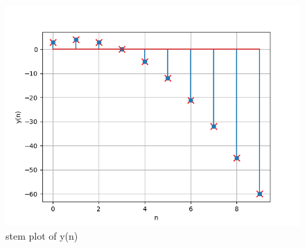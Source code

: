 \documentclass[a4,12pt,onecolumn]{IEEEtran}
\begin{document}
\begin{figure}[ht!]
\includegraphics[width=\columnwidth]{ncert-maths/10/5/3/11/figs/main.png}
\caption{\large{stem plot of y(n)}}
\end{figure}
\end{document}
